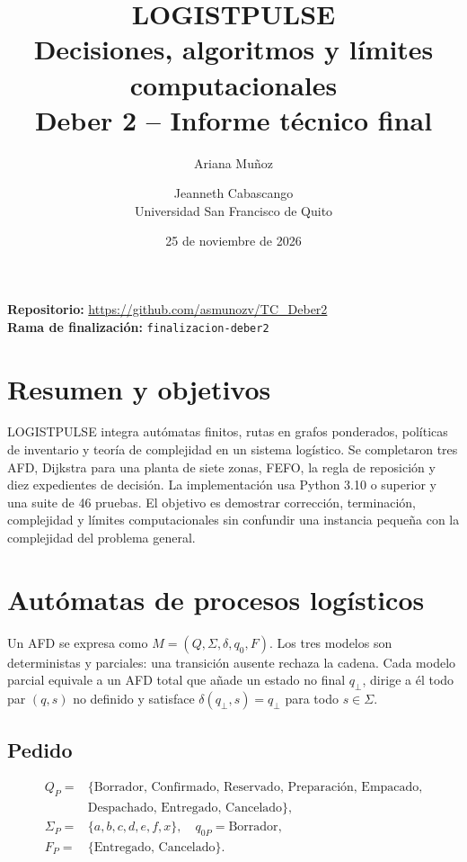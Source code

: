\documentclass[11pt,a4paper]{article}
\title{\vspace{-1cm}\textbf{LOGISTPULSE}\\[0.3cm]
\Large Decisiones, algoritmos y límites computacionales\\[0.4cm]
\large Deber 2 -- Informe técnico final}
\author{Ariana Muñoz \and Jeanneth Cabascango\\
Universidad San Francisco de Quito}
\date{25 de noviembre de 2026}
\newcommand{\code}[1]{\texttt{#1}}
\begin{document}
\maketitle
\thispagestyle{empty}
\begin{center}
\vfill
\textbf{Repositorio:} \url{https://github.com/asmunozv/TC_Deber2}\\[0.4cm]
\textbf{Rama de finalización:} \code{finalizacion-deber2}\\[0.8cm]
\vfill
\end{center}
\newpage
\tableofcontents
\newpage

\section{Resumen y objetivos}

LOGISTPULSE integra autómatas finitos, rutas en grafos ponderados, políticas de inventario y teoría de complejidad en un sistema logístico. Se completaron tres AFD, Dijkstra para una planta de siete zonas, FEFO, la regla de reposición y diez expedientes de decisión. La implementación usa Python 3.10 o superior y una suite de 46 pruebas. El objetivo es demostrar corrección, terminación, complejidad y límites computacionales sin confundir una instancia pequeña con la complejidad del problema general.

\section{Autómatas de procesos logísticos}

Un AFD se expresa como $M=(Q,\Sigma,\delta,q_0,F)$. Los tres modelos son deterministas y parciales: una transición ausente rechaza la cadena. Cada modelo parcial equivale a un AFD total que añade un estado no final $q_{\bot}$, dirige a él todo par $(q,s)$ no definido y satisface $\delta(q_{\bot},s)=q_{\bot}$ para todo $s\in\Sigma$.

\subsection{Pedido}

\begin{align*}
Q_P={}&\{\text{Borrador, Confirmado, Reservado, Preparación, Empacado,}\nonumber\\
&\text{Despachado, Entregado, Cancelado}\},\\
\Sigma_P={}&\{a,b,c,d,e,f,x\},\quad q_{0P}=\text{Borrador},\\
F_P={}&\{\text{Entregado, Cancelado}\}.
\end{align*}
\end{document}
